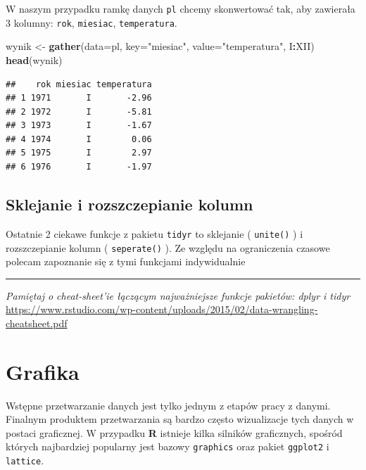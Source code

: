 \documentclass[]{book}
\newenvironment{Shaded}{\begin{snugshade}}{\end{snugshade}}
\newcommand{\KeywordTok}[1]{\textcolor[rgb]{0.13,0.29,0.53}{\textbf{#1}}}
\newcommand{\DataTypeTok}[1]{\textcolor[rgb]{0.13,0.29,0.53}{#1}}
\newcommand{\StringTok}[1]{\textcolor[rgb]{0.31,0.60,0.02}{#1}}
\newcommand{\OperatorTok}[1]{\textcolor[rgb]{0.81,0.36,0.00}{\textbf{#1}}}
\newcommand{\NormalTok}[1]{#1}
\theoremstyle{definition}
\theoremstyle{definition}
\theoremstyle{definition}
\theoremstyle{remark}
\begin{document}
W naszym przypadku ramkę danych \texttt{pl} chcemy skonwertować tak, aby
zawierała 3 kolumny: \texttt{rok}, \texttt{miesiac},
\texttt{temperatura}.

\begin{Shaded}
\begin{Highlighting}[]
\NormalTok{wynik <-}\StringTok{ }\KeywordTok{gather}\NormalTok{(}\DataTypeTok{data=}\NormalTok{pl, }\DataTypeTok{key=}\StringTok{"miesiac"}\NormalTok{, }\DataTypeTok{value=}\StringTok{"temperatura"}\NormalTok{, I}\OperatorTok{:}\NormalTok{XII)}
\KeywordTok{head}\NormalTok{(wynik)}
\end{Highlighting}
\end{Shaded}

\begin{verbatim}
##    rok miesiac temperatura
## 1 1971       I       -2.96
## 2 1972       I       -5.81
## 3 1973       I       -1.67
## 4 1974       I        0.06
## 5 1975       I        2.97
## 6 1976       I       -1.97
\end{verbatim}

\section{Sklejanie i rozszczepianie
kolumn}\label{sklejanie-i-rozszczepianie-kolumn}

Ostatnie 2 ciekawe funkcje z pakietu \texttt{tidyr} to sklejanie (
\texttt{unite()} ) i rozszczepianie kolumn ( \texttt{seperate()} ). Ze
względu na ograniczenia czasowe polecam zapoznanie się z tymi funkcjami
indywidualnie

\begin{center}\rule{0.5\linewidth}{\linethickness}\end{center}

\emph{Pamiętaj o cheat-sheet'ie łączącym najważniejsze funkcje pakietów:
dplyr i tidyr}
\url{https://www.rstudio.com/wp-content/uploads/2015/02/data-wrangling-cheatsheet.pdf}

\chapter{Grafika}\label{grafika}

Wstępne przetwarzanie danych jest tylko jednym z etapów pracy z danymi.
Finalnym produktem przetwarzania są bardzo często wizualizacje tych
danych w postaci graficznej. W przypadku \textbf{R} istnieje kilka
silników graficznych, spośród których najbardziej popularny jest bazowy
\texttt{graphics} oraz pakiet \texttt{ggplot2} i \texttt{lattice}.
\end{document}
